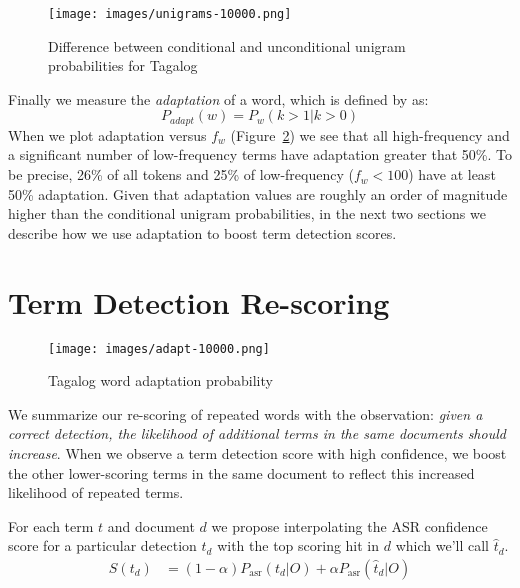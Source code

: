 \documentclass[11pt]{article}
\begin{document}
\begin{figure}[t]
\centering
\texttt{[image: images/unigrams-10000.png]}
\begin{caption}{Difference between conditional and unconditional unigram probabilities for Tagalog}
\label{ugpng}
\end{caption}
\end{figure}

Finally we measure the {\em adaptation} of a word, which is defined by   as:
\begin{equation}
 P_{adapt}(w) = P_w(k>1|k>0) 
\end{equation} 
When we plot adaptation versus $f_w$ (Figure~\ref{adapt})  we see that all high-frequency and a significant number of low-frequency terms have adaptation greater that 50\%.  To be precise, 26\% of all tokens and 25\% of low-frequency ($f_w < 100$) have at least 50\% adaptation.  Given that adaptation values are roughly an order of magnitude higher than the conditional unigram probabilities, in the next two sections we describe how we use adaptation to boost term detection scores.


\section{Term Detection Re-scoring}

\begin{figure}[t]
\centering
\texttt{[image: images/adapt-10000.png]}
\begin{caption}{Tagalog word adaptation probability}
\label{adapt}
\end{caption}
\end{figure}


We summarize our re-scoring of repeated words with the observation:  {\em given a correct detection, the likelihood of additional terms in the same documents should increase}.   When we observe a term detection score with high confidence, we boost the other lower-scoring terms in the same document to reflect this increased likelihood of repeated terms.  

For each term $t$ and document $d$ we propose interpolating the ASR confidence score for a particular detection $t_d$ with the top scoring hit in $d$ which we'll call $\widehat{t}_d$.  
\begin{align}
S(t_d) &= (1-\alpha)P_{\mathrm{asr}}(t_d|O) + \alpha P_{\mathrm{asr}}(\widehat{t}_d|O) 
\label{interp}
\end{align}
\end{document}

